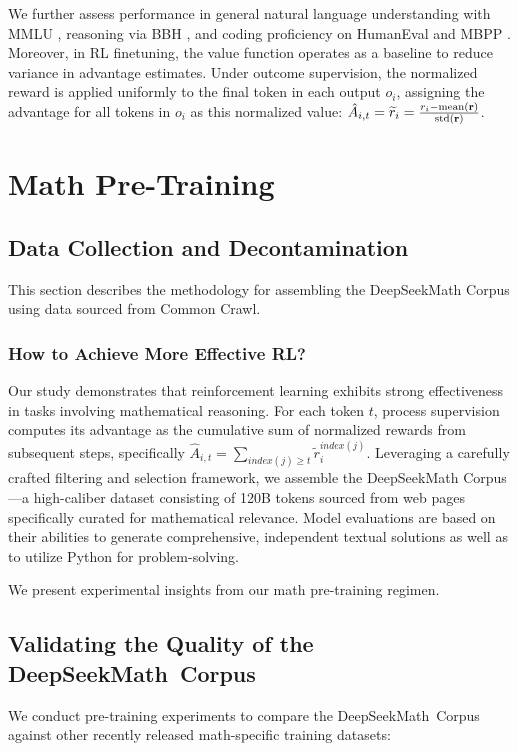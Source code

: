 {We further assess performance in general natural language understanding with MMLU \citep{mmlu}, reasoning via BBH \citep{bbh}, and coding proficiency on HumanEval \citep{codex} and MBPP \citep{mbpp}. Moreover, in RL finetuning, the value function operates as a baseline to reduce variance in advantage estimates. Under outcome supervision, the normalized reward is applied uniformly to the final token in each output $o_i$, assigning the advantage for all tokens in $o_i$ as this normalized value: $\hat{A}_{i, t} = \widetilde{r}_i = \frac{r_i- {\rm mean}(\mathbf{r})}{{\rm std}(\mathbf{r})}$. \section{Math Pre-Training}

\subsection{Data Collection and Decontamination} This section describes the methodology for assembling the DeepSeekMath Corpus using data sourced from Common Crawl. \subsubsection{How to Achieve More Effective RL?}
\label{sec:effec_rl}
Our study demonstrates that reinforcement learning exhibits strong effectiveness in tasks involving mathematical reasoning. For each token $t$, process supervision computes its advantage as the cumulative sum of normalized rewards from subsequent steps, specifically $\hat{A}_{i, t} = \sum_{index(j) \ge t} \widetilde{r}_i^{index(j)}$. Leveraging a carefully crafted filtering and selection framework, we assemble the DeepSeekMath Corpus—a high-caliber dataset consisting of 120B tokens sourced from web pages specifically curated for mathematical relevance. Model evaluations are based on their abilities to generate comprehensive, independent textual solutions as well as to utilize Python for problem-solving. \item We present experimental insights from our math pre-training regimen. \subsection{Validating the Quality of the DeepSeekMath~Corpus}

We conduct pre-training experiments to compare the DeepSeekMath~Corpus against other recently released math-specific training datasets:

}
